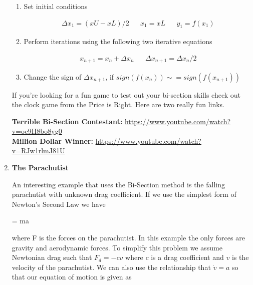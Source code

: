 \begin{enumerate}
\begin{enumerate}
\item Set initial conditions

\begin{equation}\nonumber
\begin{matrix}
\Delta x_1 = (xU-xL)/2 && x_1 = xL && y_1 = f(x_1) 
\end{matrix}
\end{equation}

\item Perform iterations using the following two iterative equations
  
\begin{equation}\nonumber
\begin{matrix}
x_{n+1} = x_n + \Delta x_n && \Delta x_{n+1} = \Delta x_n /2
\end{matrix}
\end{equation}

\item Change the sign of $\Delta x_{n+1}$, if $sign(f(x_n)) \sim= sign(f(x_{n+1}))$

\end{enumerate}

\begin{framed}

If you're looking for a fun game to test out your bi-section skills
check out the clock game from the Price is Right. Here are two really fun
links. 

{\bf Terrible Bi-Section Contestant:} \url{https://www.youtube.com/watch?v=oc9H8bo8yg0}\\
{\bf Million Dollar Winner:}
\url{https://www.youtube.com/watch?v=RJw1rlmJ81U}

\end{framed}

\item{\bf The Parachutist}

  An interesting example that uses the Bi-Section method is the falling
  parachutist with unknown drag coefficient. If we use the simplest
  form of Newton's Second Law we have

  \beq
   = ma
  \eeq

  where F is the forces on the parachutist. In this example the only
  forces are gravity and aerodynamic forces. To simplify this problem
  we assume Newtonian drag such that $F_d=-cv$ where $c$ is a drag
  coefficient and $v$ is the velocity of the parachutist. We can also
  use the relationship that $\dot{v}=a$ so that our equation of motion
  is given as


\end{enumerate}
